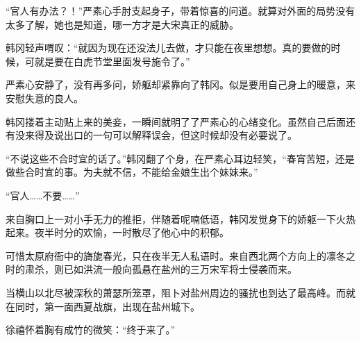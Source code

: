 “官人有办法？！”严素心手肘支起身子，带着惊喜的问道。就算对外面的局势没有太多了解，她也是知道，哪一方才是大宋真正的威胁。

韩冈轻声喟叹：“就因为现在还没法儿去做，才只能在夜里想想。真的要做的时候，可就是要在白虎节堂里面发号施令了。”

严素心安静了，没有再多问，娇躯却紧靠向了韩冈。似是要用自己身上的暖意，来安慰失意的良人。

韩冈搂着主动贴上来的美妾，一瞬间就明了了严素心的心绪变化。虽然自己后面还有没来得及说出口的一句可以解释误会，但这时候却没有必要说了。

“不说这些不合时宜的话了。”韩冈翻了个身，在严素心耳边轻笑，“春宵苦短，还是做些合时宜的事。为夫就不信，不能给金娘生出个妹妹来。”

“官人……不要……”

来自胸口上一对小手无力的推拒，伴随着呢喃低语，韩冈发觉身下的娇躯一下火热起来。夜半时分的欢愉，一时散尽了他心中的积郁。

可惜太原府衙中的旖旎春光，只在夜半无人私语时。来自西北两个方向上的凛冬之时的肃杀，则已如洪流一般向孤悬在盐州的三万宋军将士侵袭而来。

当横山以北尽被深秋的萧瑟所笼罩，阻卜对盐州周边的骚扰也到达了最高峰。而就在同时，第一面西夏战旗，出现在盐州城下。

徐禧怀着胸有成竹的微笑：“终于来了。”

